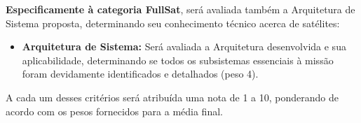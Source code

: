         \textbf{Especificamente à categoria FullSat}, será avaliada também a Arquitetura de Sistema proposta, determinando seu conhecimento técnico acerca de satélites:        
        \begin{itemize}
            \item \textbf{Arquitetura de Sistema:} Será avaliada a Arquitetura desenvolvida e sua aplicabilidade, determinando se todos os subsistemas essenciais à missão foram devidamente identificados e detalhados (peso 4). 
        \end{itemize}
        
        A cada um desses critérios será atribuída uma nota de 1 a 10, ponderando de acordo com os 
        pesos fornecidos para a média final.
